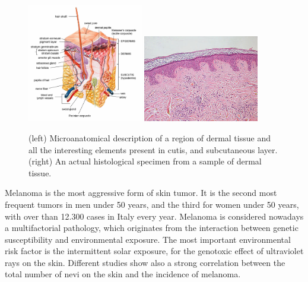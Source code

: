     \begin{figure}
        \centering
        \includegraphics[width = 0.45\textwidth]{images/derm_scheme}
        \includegraphics[width = 0.45\textwidth]{images/derm_specimen}

        \caption{(left) Microanatomical description of a region of dermal tissue and all the interesting elements present in cutis, and subcutaneous layer. (right) An actual histological specimen from a sample of dermal tissue.}
        \label{fig:derm_descr}
    \end{figure}

    Melanoma is the most aggressive form of skin tumor. It is the second most frequent tumors in men under 50 years, and the third for women under 50 years, with over than 12.300 cases in Italy every year. Melanoma is considered nowadays a multifactorial pathology, which originates from the interaction between genetic susceptibility and environmental exposure. The most important environmental risk factor is the intermittent solar exposure, for the genotoxic effect of ultraviolet rays on the skin. Different studies show also a strong correlation between the total number of nevi on the skin and the incidence of melanoma.


